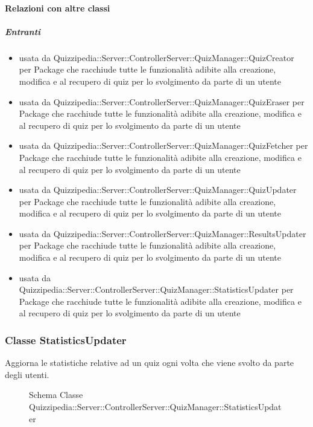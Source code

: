 \paragraph{Relazioni con altre classi}
\subparagraph{Entranti}
\begin{itemize}
\item usata da Quizzipedia::Server::ControllerServer::QuizManager::QuizCreator per Package che racchiude tutte le funzionalità adibite alla creazione, modifica e al recupero di quiz per lo svolgimento da parte di un utente
\item usata da Quizzipedia::Server::ControllerServer::QuizManager::QuizEraser per Package che racchiude tutte le funzionalità adibite alla creazione, modifica e al recupero di quiz per lo svolgimento da parte di un utente
\item usata da Quizzipedia::Server::ControllerServer::QuizManager::QuizFetcher per Package che racchiude tutte le funzionalità adibite alla creazione, modifica e al recupero di quiz per lo svolgimento da parte di un utente
\item usata da Quizzipedia::Server::ControllerServer::QuizManager::QuizUpdater per Package che racchiude tutte le funzionalità adibite alla creazione, modifica e al recupero di quiz per lo svolgimento da parte di un utente
\item usata da Quizzipedia::Server::ControllerServer::QuizManager::ResultsUpdater per Package che racchiude tutte le funzionalità adibite alla creazione, modifica e al recupero di quiz per lo svolgimento da parte di un utente
\item usata da Quizzipedia::Server::ControllerServer::QuizManager::StatisticsUpdater per Package che racchiude tutte le funzionalità adibite alla creazione, modifica e al recupero di quiz per lo svolgimento da parte di un utente
\end{itemize}
\subsubsection{Classe StatisticsUpdater}
Aggiorna le statistiche relative ad un quiz ogni volta che viene svolto da parte degli utenti.
\begin{figure}[H]
\centering
\noindent{}
\caption[Schema Classe StatisticsUpdater]{Schema Classe Quizzipedia::Server::ControllerServer::QuizManager::StatisticsUpdater}
\end{figure}

